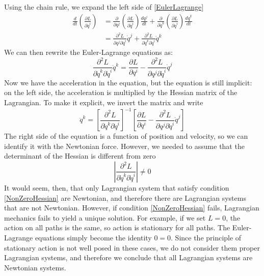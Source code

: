 \documentclass[11pt]{article}
\begin{document}
Using the chain rule, we expand the left side of \eqref{EulerLagrange}
\begin{align*}
	\frac{d}{dt} \left( \frac{\partial L}{\partial \dot{q}^i} \right) &= \frac{\partial}{\partial q^j} \left( \frac{\partial L}{\partial \dot{q}^i} \right) \frac{dq^j}{dt} + \frac{\partial}{\partial \dot{q}^k} \left( \frac{\partial L}{\partial \dot{q}^i} \right) \frac{d\dot{q}^k}{dt} \\
	&= \frac{\partial^2 L}{\partial q^j \partial \dot{q}^i} \dot{q}^j + \frac{\partial^2 L}{\partial \dot{q}^k \partial \dot{q}^i} \ddot{q}^k
\end{align*}
We can then rewrite the Euler-Lagrange equations as:
\begin{equation}
	\label{EulerLagrangeMod}
	\frac{\partial^2 L}{\partial \dot{q}^k \partial \dot{q}^i} \ddot{q}^k = \frac{\partial L}{\partial q^i} -  \frac{\partial^2 L}{\partial q^j \partial \dot{q}^i} \dot{q}^j
\end{equation}
Now we have the acceleration in the equation, but the equation is still implicit: on the left side, the acceleration is multiplied by the Hessian matrix of the Lagrangian. To make it explicit, we invert the matrix and write
\begin{equation}
	\label{EulerLagrangeExpl}
	 \ddot{q}^k = \left[ \frac{\partial^2 L}{\partial \dot{q}^k \partial \dot{q}^i} \right]^{-1} \left[ \frac{\partial L}{\partial q^i} -  \frac{\partial^2 L}{\partial q^j \partial \dot{q}^i} \dot{q}^j \right]
\end{equation}
The right side of the equation is a function of position and velocity, so we can identify it with the Newtonian force. However, we needed to assume that the determinant of the Hessian is different from zero
\begin{equation}
	\label{NonZeroHessian}
	\left| \frac{\partial^2 L}{\partial \dot{q}^k \partial \dot{q}^i} \right| \neq 0
\end{equation}
It would seem, then, that only Lagrangian system that satisfy condition \eqref{NonZeroHessian} are Newtonian, and therefore there are Lagrangian systems that are not Newtonian. However, if condition \eqref{NonZeroHessian} fails, Lagrangian mechanics fails to yield a unique solution. For example, if we set $L=0$, the action on all paths is the same, so action is stationary for all paths. The Euler-Lagrange equations simply become the identity $0=0$. Since the principle of stationary action is not well posed in these cases, we do not consider them proper Lagrangian systems, and therefore we conclude that all Lagrangian systems are Newtonian systems.
\end{document}
